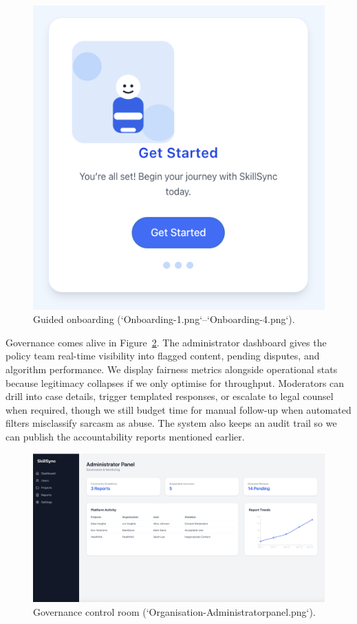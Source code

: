 \begin{figure}[h]
\begin{minipage}[b]{0.3\linewidth}
    \includegraphics[width=\linewidth]{figures/Onboarding-4.png}
  \end{minipage}
  \caption{Guided onboarding (`Onboarding-1.png`--`Onboarding-4.png`).}
  \label{fig:onboarding-flow}
\end{figure}

Governance comes alive in Figure~\ref{fig:admin-panel}. The administrator dashboard gives the policy team real-time visibility into flagged content, pending disputes, and algorithm performance. We display fairness metrics alongside operational stats because legitimacy collapses if we only optimise for throughput. Moderators can drill into case details, trigger templated responses, or escalate to legal counsel when required, though we still budget time for manual follow-up when automated filters misclassify sarcasm as abuse. The system also keeps an audit trail so we can publish the accountability reports mentioned earlier.

\begin{figure}[h]
  \centering
  \includegraphics[width=0.85\linewidth]{figures/Organisation-Administratorpanel.png}
  \caption{Governance control room (`Organisation-Administratorpanel.png`).}
  \label{fig:admin-panel}
\end{figure}

